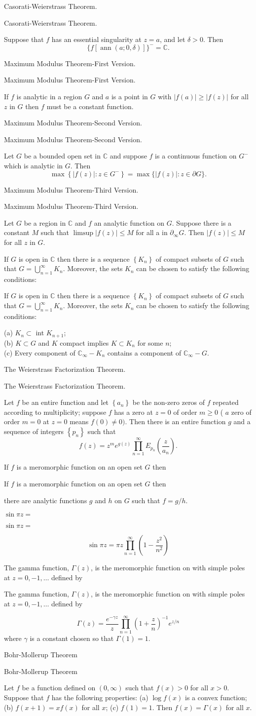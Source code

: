 \documentclass[17pt]{extarticle}
\newcommand{\boxset}[2]{\begin{mdframed}[style=darkQuesion]
#1
\end{mdframed}
\newpage
\begin{mdframed}[style=darkQuesion]
  #1
    \end{mdframed}
\begin{mdframed}[style=darkAnswer]
  #2
    \end{mdframed}
    \newpage
}
\begin{document}
\boxset{Casorati-Weierstrass Theorem.}
{Suppose that $f$ has an essential singularity at $z=a$, and let $\delta>0$. Then
$$
\{f[\operatorname{ann}(a ; 0, \delta)]\}^{-}=\mathbb{C} .
$$
}

\boxset{Maximum Modulus Theorem-First Version.}
{If $f$ is analytic in a region $G$ and $a$ is a point in $G$ with $|f(a)| \geq|f(z)|$ for all $z$ in $G$ then $f$ must be a constant function.}

\boxset{Maximum Modulus Theorem-Second Version.}
{Let $G$ be a bounded open set in $\mathbb{C}$ and suppose $f$ is a continuous function on $G^{-}$which is analytic in $G$. Then
$$
\max \left\{|f(z)|: z \in G^{-}\right\}=\max \{|f(z)|: z \in \partial G\} .
$$
}

\boxset{Maximum Modulus Theorem-Third Version.}
{Let $G$ be a region in $\mathbb{C}$ and $f$ an analytic function on $G$. Suppose there is a constant $M$ such that $\limsup |f(z)| \leq M$ for all a in $\partial_{\infty} G$. Then $|f(z)| \leq M$ for all $z$ in $G$.}

\boxset{If $G$ is open in $\mathbb{C}$ then there is a sequence $\left\{K_{n}\right\}$ of compact subsets of $G$ such that $G=\bigcup_{n=1}^{\infty} K_{n}$. Moreover, the sets $K_{n}$ can be chosen to satisfy the following conditions:}
{
(a) $K_{n} \subset$ int $K_{n+1}$;\[\ \]
(b) $K \subset G$ and $K$ compact implies $K \subset K_{n}$ for some $n$;\[\ \]
(c) Every component of $\mathbb{C}_{\infty}-K_{n}$ contains a component of $\mathbb{C}_{\infty}-G$.
}

\boxset{The Weierstrass Factorization Theorem.}
{Let $f$ be an entire function and let $\left\{a_{n}\right\}$ be the non-zero zeros of $f$ repeated according to multiplicity; suppose $f$ has a zero at $z=0$ of order $m \geqslant 0$ ( $a$ zero of order $m=0$ at $z=0$ means $f(0) \neq 0)$. Then there is an entire function $g$ and a sequence of integers $\left\{p_{n}\right\}$ such that
$$
f(z)=z^{m} e^{g(z)} \prod_{n=1}^{\infty} E_{p_{n}}\left(\frac{z}{a_{n}}\right) .
$$
}

\boxset{If $f$ is a meromorphic function on an open set $G$ then}
{there are analytic functions $g$ and $h$ on $G$ such that $f=g / h$.}

\boxset{$\sin \pi z=$}
{
$$
\sin \pi z=\pi z \prod_{n=1}^{\infty}\left(1-\frac{z^{2}}{n^{2}}\right)
$$
}

\boxset{The gamma function, $\Gamma(z)$, is the meromorphic function on with simple poles at $z=0,-1, \ldots$ defined by}
{
$$
\Gamma(z)=\frac{e^{-\gamma z}}{z} \prod_{n=1}^{\infty}\left(1+\frac{z}{n}\right)^{-1} e^{z / n}
$$
where $\gamma$ is a constant chosen so that $\Gamma(1)=1$.
}
\boxset{Bohr-Mollerup Theorem}
{Let $f$ be a function defined on $(0, \infty)$ such that $f(x)>0$ for all $x>0$. Suppose that $f$ has the following properties:
(a) $\log f(x)$ is a convex function;
(b) $f(x+1)=x f(x)$ for all $x$;
(c) $f(1)=1$.
Then $f(x)=\Gamma(x)$ for all $x$.
}
\end{document}
